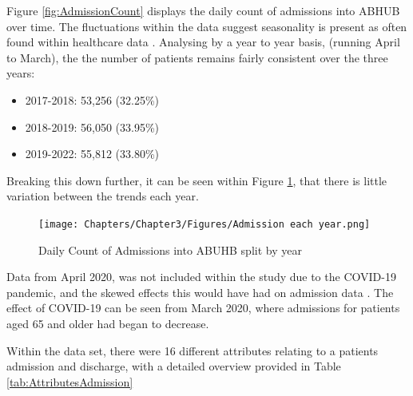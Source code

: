 \documentclass[../thesis.tex]{subfiles}
\begin{document}
Figure \ref{fig:AdmissionCount} displays the daily count of admissions into ABHUB over time. The fluctuations within the data suggest seasonality is present as often found within healthcare data \cite{Upshur2005}.
Analysing by a year to year basis, (running April to March), the the number of patients remains fairly consistent over the three years:
\begin{itemize}
    \item 2017-2018: 53,256 (32.25\%)
    \item 2018-2019: 56,050 (33.95\%)
    \item 2019-2022: 55,812 (33.80\%)
\end{itemize}
Breaking this down further, it can be seen within Figure \ref{fig:AdmissionCountyear}, that there is little variation between the trends each year.
\begin{figure}[h!]
    \centering
    \texttt{[image: Chapters/Chapter3/Figures/Admission each year.png]}
    \caption{Daily Count of Admissions into ABUHB split by year}
    \label{fig:AdmissionCountyear}
\end{figure}

Data from April 2020, was not included within the study due to the COVID-19 pandemic, and the skewed effects this would have had on admission data \cite{Venkatesan2020}. The effect of COVID-19 can be seen from March 2020, where admissions for patients aged 65 and older had began to decrease.

Within the data set, there were 16 different attributes relating to a patients admission and discharge, with a detailed overview provided in Table \ref{tab:AttributesAdmission}
\end{document}
